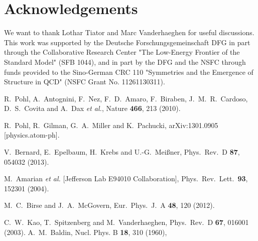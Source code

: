 \documentclass[prc,twocolumn,showpacs,preprintnumbers,amsmath,amssymb
,superscriptaddress,a4paper,nofootinbib
]{revtex4-1}
\begin{document}
\section*{Acknowledgements}

We want to thank Lothar Tiator and Marc Vanderhaeghen for useful discussions. This work was supported by the Deutsche Forschungsgemeinschaft DFG in part through the
Collaborative Research Center "The Low-Energy Frontier of the Standard Model" (SFB 1044),  and in part by the DFG and the NSFC through funds provided to the Sino-German CRC 110 "Symmetries and the Emergence of Structure in QCD" (NSFC Grant No. 11261130311).

\begin{thebibliography}{99} 

  R.~Pohl, A.~Antognini, F.~Nez, F.~D.~Amaro, F.~Biraben, J.~M.~R.~Cardoso, D.~S.~Covita and A.~Dax {\it et al.},
  Nature {\bf 466}, 213 (2010).
  
  R.~Pohl, R.~Gilman, G.~A.~Miller and K.~Pachucki,
  arXiv:1301.0905 [physics.atom-ph].
  
  V.~Bernard, E.~Epelbaum, H.~Krebs and U.-G.~Mei\ss ner,
  Phys.\ Rev.\ D {\bf 87}, 054032 (2013).
  
  M.~Amarian {\it et al.}  [Jefferson Lab E94010 Collaboration],
  Phys.\ Rev.\ Lett.\  {\bf 93}, 152301 (2004).
  
  M.~C.~Birse and J.~A.~McGovern,
  Eur.\ Phys.\ J.\ A {\bf 48}, 120 (2012).
  
  C.~W.~Kao, T.~Spitzenberg and M.~Vanderhaeghen,
  Phys.\ Rev.\ D {\bf 67}, 016001 (2003).
  A.~M.~Baldin, Nucl. Phys. B {\bf 18}, 310 (1960),
  

\end{thebibliography}
\end{document}
